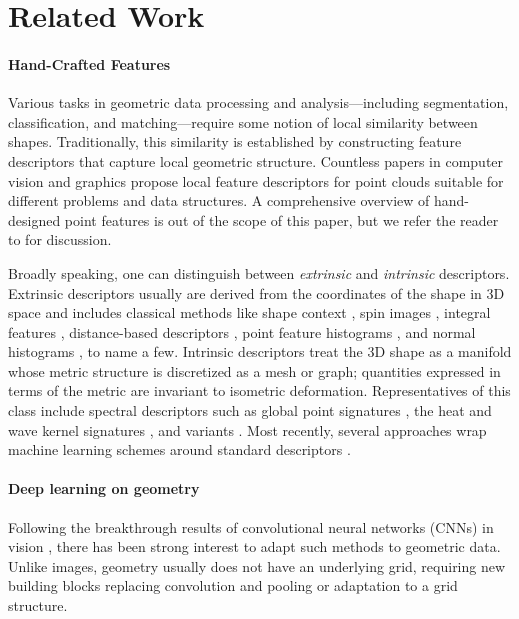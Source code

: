 \documentclass[acmtog]{acmart}
\begin{document}
 \section{Related Work}

\paragraph*{Hand-Crafted Features} Various tasks in geometric data processing and analysis---including segmentation, classification, and matching---require some notion of local similarity between shapes. Traditionally, this similarity is established by constructing feature descriptors that capture local geometric structure. Countless papers in computer vision and graphics propose local feature descriptors for point clouds suitable for different problems and data structures.  A comprehensive overview of hand-designed point features is out of the scope of this paper, but we refer the reader to \cite{van2011survey, guo20143d, biasotti2016recent} for discussion.

Broadly speaking, one can distinguish between \textit{extrinsic} and \textit{intrinsic} descriptors. Extrinsic descriptors usually are derived from the coordinates of the shape in 3D space and includes classical methods like shape context \cite{belongie2001shape}, spin images \cite{johnson1999using}, integral features \cite{manay2006integral}, distance-based descriptors \cite{ling2007shape}, point feature histograms \cite{rusu2008aligning, rusu2009fast}, and normal histograms \cite{tombari2011combined}, to name a few. Intrinsic descriptors treat the 3D shape as a manifold whose metric structure is discretized as a mesh or graph; quantities expressed in terms of the metric are invariant to isometric deformation. Representatives of this class include spectral descriptors such as global point signatures \cite{rustamov2007laplace}, the heat and wave kernel signatures \cite{sun2009concise,aubry2011wave}, and variants \cite{bronstein2010scale}. Most recently, several approaches wrap machine learning schemes around standard descriptors \cite{guo20143d, shah20133d}. 

\paragraph*{Deep learning on geometry} Following the breakthrough results of convolutional neural networks (CNNs) in vision \cite{lecun1989backpropagation,krizhevsky2012imagenet}, there has been strong interest to adapt such methods to geometric data. 
Unlike images, geometry usually does not have an underlying grid, requiring new building blocks replacing convolution and pooling or adaptation to a grid structure. 
\end{document}
